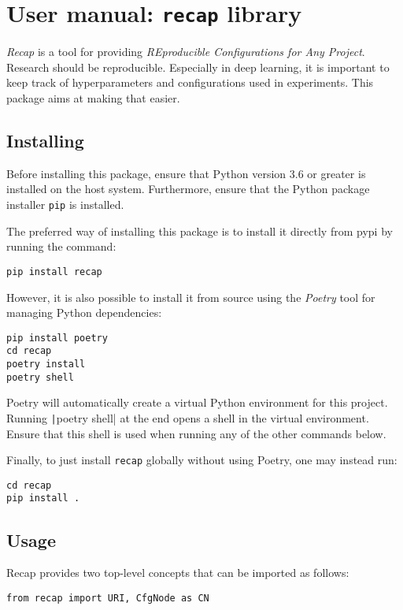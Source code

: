 \documentclass[../../report.tex]{subfiles}
\begin{document}
\chapter{User manual: \texttt{recap} library}
\label{chap:user_man_recap}

\emph{Recap} is a tool for providing \emph{REproducible Configurations for Any Project}.
Research should be reproducible.
Especially in deep learning, it is important to keep track of hyperparameters and configurations used in experiments.
This package aims at making that easier.

\section{Installing}
\label{sec:recap_installation}
Before installing this package, ensure that Python version 3.6 or greater is installed on the host system.
Furthermore, ensure that the Python package installer \texttt{pip} is installed.

The preferred way of installing this package is to install it directly from \gls{pypi} by running the command:
\begin{verbatim}
pip install recap
\end{verbatim}

However, it is also possible to install it from source using the \emph{Poetry} tool for managing Python dependencies:
\begin{verbatim}
pip install poetry
cd recap
poetry install
poetry shell
\end{verbatim}
Poetry will automatically create a virtual Python environment for this project.
Running \texttt|poetry shell| at the end opens a shell in the virtual environment. 
Ensure that this shell is used when running any of the other commands below.

Finally, to just install \texttt{recap} globally without using Poetry, one may instead run:
\begin{verbatim}
cd recap
pip install .
\end{verbatim}

\section{Usage}
Recap provides two top-level concepts that can be imported as follows:
\begin{verbatim}
from recap import URI, CfgNode as CN
\end{verbatim}
\end{document}
